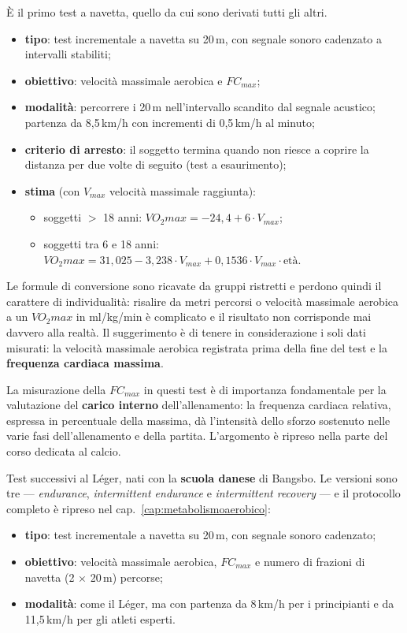 È il primo test a navetta, quello da cui sono derivati tutti gli altri.
\begin{itemize}
  \item \textbf{tipo}: test incrementale a navetta su 20\,m, con segnale sonoro cadenzato a
    intervalli stabiliti;
  \item \textbf{obiettivo}: velocità massimale aerobica e $FC_{max}$;
  \item \textbf{modalità}: percorrere i 20\,m nell'intervallo scandito dal segnale acustico;
    partenza da 8,5\,km/h con incrementi di 0,5\,km/h al minuto;
  \item \textbf{criterio di arresto}: il soggetto termina quando non riesce a coprire la distanza
    per due volte di seguito (test a esaurimento);
  \item \textbf{stima} (con $V_{max}$ velocità massimale raggiunta):
    \begin{itemize}
      \item soggetti $>$ 18 anni: $VO_2max = -24{,}4 + 6 \cdot V_{max}$;
      \item soggetti tra 6 e 18 anni: $VO_2max = 31{,}025 - 3{,}238 \cdot V_{max} + 0{,}1536 \cdot
        V_{max} \cdot \textrm{età}$.
    \end{itemize}
\end{itemize}

Le formule di conversione sono ricavate da gruppi ristretti e perdono quindi il carattere di
individualità: risalire da metri percorsi o velocità massimale aerobica a un $VO_2max$ in ml/kg/min
è complicato e il risultato non corrisponde mai davvero alla realtà. Il suggerimento è di tenere in
considerazione i soli dati misurati: la velocità massimale aerobica registrata prima della fine del
test e la \textbf{frequenza cardiaca massima}.

La misurazione della $FC_{max}$ in questi test è di importanza fondamentale per la valutazione del
\textbf{carico interno} dell'allenamento: la frequenza cardiaca relativa, espressa in percentuale
della massima, dà l'intensità dello sforzo sostenuto nelle varie fasi dell'allenamento e della
partita. L'argomento è ripreso nella parte del corso dedicata al calcio.

Test successivi al Léger, nati con la \textbf{scuola danese} di Bangsbo. Le versioni sono tre ---
\textit{endurance}, \textit{intermittent endurance} e \textit{intermittent recovery} --- e il
protocollo completo è ripreso nel cap.~\ref{cap:metabolismoaerobico}:
\begin{itemize}
  \item \textbf{tipo}: test incrementale a navetta su 20\,m, con segnale sonoro cadenzato;
  \item \textbf{obiettivo}: velocità massimale aerobica, $FC_{max}$ e numero di frazioni di navetta
    (2 $\times$ 20\,m) percorse;
  \item \textbf{modalità}: come il Léger, ma con partenza da 8\,km/h per i principianti e da
    11,5\,km/h per gli atleti esperti.
\end{itemize}

